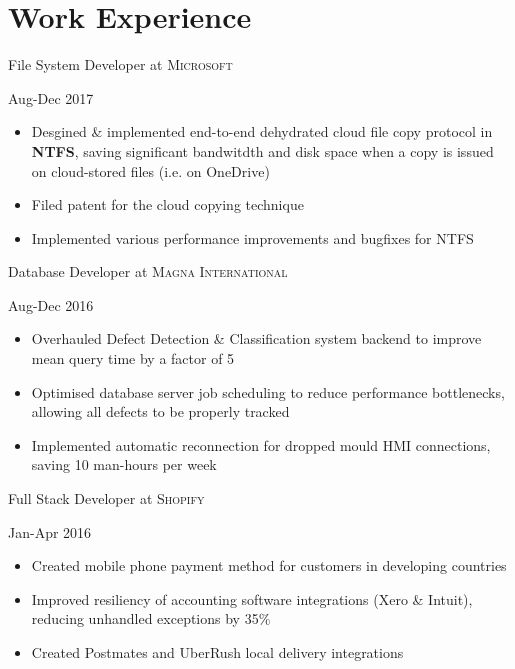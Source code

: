 \documentclass[a4paper,10pt]{article}
\begin{document}
\begin{minipage}[t]{0.60\textwidth} %

\section{Work Experience}
\medskip

\begin{large}
File System Developer at \textsc{Microsoft}
\end{large}
\hfill Aug-Dec 2017
\smallskip
\begin{itemize}
    \item {Desgined \& implemented end-to-end dehydrated cloud file copy protocol in \textbf{NTFS}, saving significant bandwitdth and disk space when a copy is issued on cloud-stored files (i.e. on OneDrive)}
    \item {Filed patent for the cloud copying technique}   %
    \item {Implemented various performance improvements and bugfixes for NTFS}
\end{itemize}
\bigskip

\begin{large}
Database Developer at \textsc{Magna International}
\end{large}
\hfill Aug-Dec 2016
\smallskip
\begin{itemize}
    \item {Overhauled Defect Detection \& Classification system backend to improve mean query time by a factor of 5}
    \item {Optimised database server job scheduling to reduce performance bottlenecks, allowing all defects to be properly tracked}
    \item {Implemented automatic reconnection for dropped mould HMI connections, saving 10 man-hours per week}
\end{itemize}
\bigskip

\begin{large}
Full Stack Developer at \textsc{Shopify}
\end{large}
\hfill Jan-Apr 2016
\smallskip
\begin{itemize}
    \item {Created mobile phone payment method for customers in developing countries}
    \item {Improved resiliency of accounting software integrations (Xero \& Intuit), reducing unhandled exceptions by 35\%}
    \item {Created Postmates and UberRush local delivery integrations}
\end{itemize}
\bigskip


\end{minipage}
\end{document}
